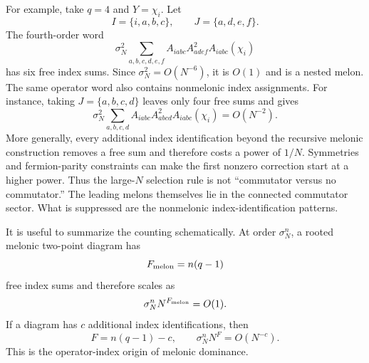 \documentclass{article}
\theoremstyle{definition}
\begin{document}
For example, take $q=4$ and $Y=\chi_i$. Let
\begin{equation}
    I=\{i,a,b,c\},
    \qquad
    J=\{a,d,e,f\}.
\end{equation}
The fourth-order word
\begin{equation}
    \sigma_N^2\sum_{a,b,c,d,e,f}
    A_{iabc}A_{adef}^2A_{iabc}(\chi_i)
    \label{eq:quenched_q4_nested_melon}
\end{equation}
has six free index sums. Since $\sigma_N^2=O(N^{-6})$, it is $O(1)$ and is a nested melon. The same operator word also contains nonmelonic index assignments. For instance, taking $J=\{a,b,c,d\}$ leaves only four free sums and gives
\begin{equation}
    \sigma_N^2\sum_{a,b,c,d}
    A_{iabc}A_{abcd}^2A_{iabc}(\chi_i)
    =O(N^{-2}).
    \label{eq:quenched_q4_nonmelon}
\end{equation}
More generally, every additional index identification beyond the recursive melonic construction removes a free sum and therefore costs a power of $1/N$. Symmetries and fermion-parity constraints can make the first nonzero correction start at a higher power. Thus the large-$N$ selection rule is not ``commutator versus no commutator.'' The leading melons themselves lie in the connected commutator sector. What is suppressed are the nonmelonic index-identification patterns.

It is useful to summarize the counting schematically. At order $\sigma_N^n$, a rooted melonic two-point diagram has
\begin{equation}
    F_{\rm melon}=n(q-1)
\end{equation}
free index sums and therefore scales as
\begin{equation}
    \sigma_N^nN^{F_{\rm melon}}=O(1).
\end{equation}
If a diagram has $c$ additional index identifications, then
\begin{equation}
    F=n(q-1)-c,
    \qquad
    \sigma_N^nN^F=O(N^{-c}).
    \label{eq:quenched_nonmelon_counting}
\end{equation}
This is the operator-index origin of melonic dominance.
\end{document}
